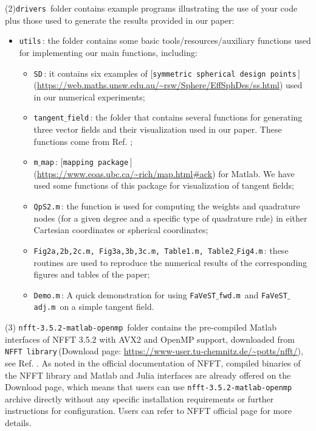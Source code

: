 \documentclass[preprint]{acmart}
\newcommand{\hlgtexttt}[1]{\texttt{\colorbox{lightgray!15}{#1}}}
\newcommand{\code}[1]{\hlgtexttt{#1}\,}
\begin{document}
(2)\code{drivers} folder contains example programs illustrating the use of your code plus those used to generate the results provided in our paper:
\begin{itemize}
  \item \code{utils}: the folder contains some basic tools/resources/auxiliary functions used for implementing our main functions, including:
  \begin{itemize}
  \item \code{SD}: it contains six examples of [\code{symmetric spherical design points}]({\color{blue}\url{https://web.maths.unsw.edu.au/~rsw/Sphere/EffSphDes/ss.html}}) used in our numerical experiments;
  \item \code{tangent$\_$field}: the folder that contains several functions for generating three vector fields and their visualization used in our paper. These functions come from Ref. \cite{FuWr2009};
 \item \code{m$\_$map}: [\code{mapping package}]({\color{blue}\url{https://www.eoas.ubc.ca/~rich/map.html#ack}}) for Matlab. We have used some functions of this package for visualization of tangent fields;
 \item \code{QpS2.m}: the function is used for computing the weights and quadrature nodes (for a given degree and a specific type of quadrature rule) in either Cartesian coordinates or spherical coordinates;
  
 \item \code{Fig2a,2b,2c.m, Fig3a,3b,3c.m, Table1.m, Table2$\_$Fig4.m}: these routines are used to reproduce the numerical results of the corresponding figures and tables of the paper;
   \item \code{Demo.m}: A quick demonstration for using \code{FaVeST$\_$fwd.m} and \code{FaVeST$\_$adj.m} on a simple tangent field.
  \end{itemize}
\end{itemize}



(3) \code{nfft-3.5.2-matlab-openmp} folder contains the pre-compiled Matlab interfaces of NFFT 3.5.2 with AVX2 and OpenMP support, downloaded from \code{NFFT library}(Download page: {\color{blue}\url{https://www-user.tu-chemnitz.de/~potts/nfft/}}), see Ref. \cite{KeKuPo2009}. As noted in the official documentation of NFFT, compiled binaries of the NFFT library and Matlab and Julia interfaces are already offered on the Download page, which means that users can use  \code{nfft-3.5.2-matlab-openmp} archive directly without any specific installation requirements or further instructions for configuration. Users can refer to NFFT official page for more details.
\end{document}
